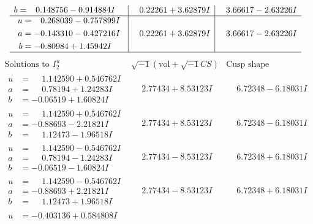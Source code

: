 \documentclass[1p]{elsarticle_modified}
\theoremstyle{definition}
\newcommand{\I}{\sqrt{-1}}
\begin{document}
$$\begin{array}{c|c|c}
\begin{aligned}
b &= \phantom{-}0.148756 - 0.914884 I\end{aligned}
 & \phantom{-}0.22261 + 3.62879 I & \phantom{-}3.66617 - 2.63226 I \\ \hline\begin{aligned}
u &= \phantom{-}0.268039 - 0.757899 I \\
a &= -0.143310 - 0.427216 I \\
b &= -0.80984 + 1.45942 I\end{aligned}
 & \phantom{-}0.22261 + 3.62879 I & \phantom{-}3.66617 - 2.63226 I\\
 \hline 
 \end{array}$$\newpage$$\begin{array}{c|c|c}  
\text{Solutions to }I^u_{2}& \I (\text{vol} + \sqrt{-1}CS) & \text{Cusp shape}\\
 \hline 
\begin{aligned}
u &= \phantom{-}1.142590 + 0.546762 I \\
a &= \phantom{-}0.78194 + 1.24283 I \\
b &= -0.06519 + 1.60824 I\end{aligned}
 & \phantom{-}2.77434 + 8.53123 I & \phantom{-}6.72348 - 6.18031 I \\ \hline\begin{aligned}
u &= \phantom{-}1.142590 + 0.546762 I \\
a &= -0.88693 - 2.21821 I \\
b &= \phantom{-}1.12473 - 1.96518 I\end{aligned}
 & \phantom{-}2.77434 + 8.53123 I & \phantom{-}6.72348 - 6.18031 I \\ \hline\begin{aligned}
u &= \phantom{-}1.142590 - 0.546762 I \\
a &= \phantom{-}0.78194 - 1.24283 I \\
b &= -0.06519 - 1.60824 I\end{aligned}
 & \phantom{-}2.77434 - 8.53123 I & \phantom{-}6.72348 + 6.18031 I \\ \hline\begin{aligned}
u &= \phantom{-}1.142590 - 0.546762 I \\
a &= -0.88693 + 2.21821 I \\
b &= \phantom{-}1.12473 + 1.96518 I\end{aligned}
 & \phantom{-}2.77434 - 8.53123 I & \phantom{-}6.72348 + 6.18031 I \\ \hline\begin{aligned}
u &= -0.403136 + 0.584808 I \\

\end{aligned}
\end{array}$$
\end{document}
